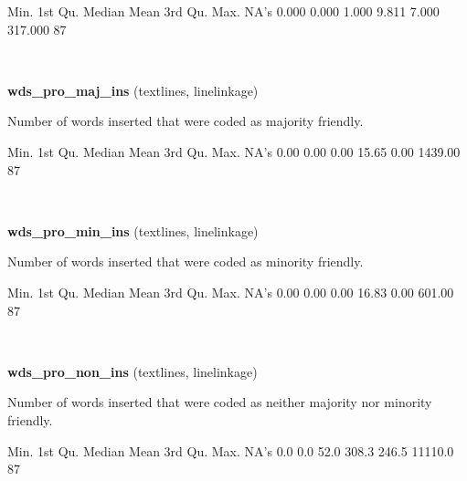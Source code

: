 \documentclass[]{article}
\newenvironment{Shaded}{\begin{snugshade}}{\end{snugshade}}
\newcommand{\StringTok}[1]{\textcolor[rgb]{0.31,0.60,0.02}{{#1}}}
\newcommand{\NormalTok}[1]{{#1}}
\begin{document}
\begin{Shaded}
\begin{Highlighting}[]
   \NormalTok{Min. 1st Qu.  Median    Mean 3rd Qu.    Max.    NA}\StringTok{'s }
\StringTok{  0.000   0.000   1.000   9.811   7.000 317.000      87 }
\end{Highlighting}
\end{Shaded}

~

\vspace{1em}

\textbf{wds\_pro\_maj\_ins} (textlines, linelinkage)

Number of words inserted that were coded as majority friendly.

\begin{Shaded}
\begin{Highlighting}[]
   \NormalTok{Min. 1st Qu.  Median    Mean 3rd Qu.    Max.    NA}\StringTok{'s }
\StringTok{   0.00    0.00    0.00   15.65    0.00 1439.00      87 }
\end{Highlighting}
\end{Shaded}

~

\vspace{1em}

\textbf{wds\_pro\_min\_ins} (textlines, linelinkage)

Number of words inserted that were coded as minority friendly.

\begin{Shaded}
\begin{Highlighting}[]
   \NormalTok{Min. 1st Qu.  Median    Mean 3rd Qu.    Max.    NA}\StringTok{'s }
\StringTok{   0.00    0.00    0.00   16.83    0.00  601.00      87 }
\end{Highlighting}
\end{Shaded}

~

\vspace{1em}

\textbf{wds\_pro\_non\_ins} (textlines, linelinkage)

Number of words inserted that were coded as neither majority nor
minority friendly.

\begin{Shaded}
\begin{Highlighting}[]
   \NormalTok{Min. 1st Qu.  Median    Mean 3rd Qu.    Max.    NA}\StringTok{'s }
\StringTok{    0.0     0.0    52.0   308.3   246.5 11110.0      87 }
\end{Highlighting}
\end{Shaded}
\end{document}
